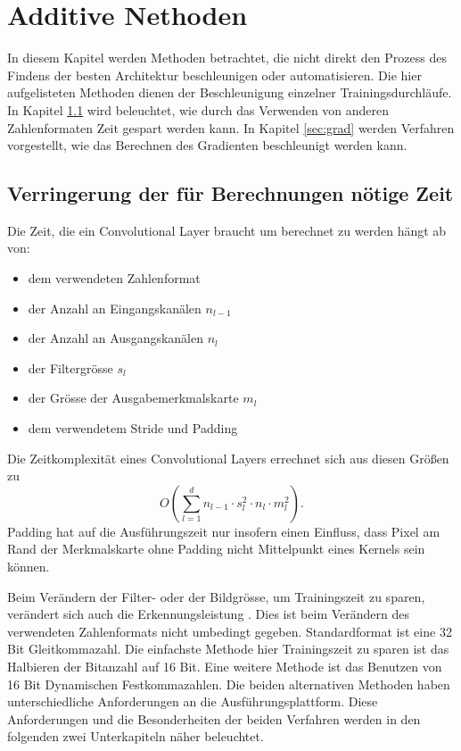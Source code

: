 \section{Additive Nethoden}\label{sec:add}
In diesem Kapitel werden Methoden betrachtet, die nicht direkt den Prozess des Findens der besten Architektur beschleunigen oder automatisieren. Die hier aufgelisteten Methoden dienen der Beschleunigung einzelner Trainingsdurchläufe. In Kapitel \ref{sec:fp16} wird beleuchtet, wie durch das Verwenden von anderen Zahlenformaten Zeit gespart werden kann. In Kapitel \ref{sec:grad} werden Verfahren vorgestellt, wie das Berechnen des Gradienten beschleunigt werden kann.
\subsection{Verringerung der für Berechnungen nötige Zeit}\label{sec:fp16}
Die Zeit, die ein Convolutional Layer braucht um berechnet zu werden hängt ab von:
\begin{itemize}
 \item dem verwendeten Zahlenformat
 \item der Anzahl an Eingangskanälen $n_{l-1}$
 \item der Anzahl an Ausgangskanälen $n_l$
 \item der Filtergr\"osse $s_l$
 \item der Grösse der Ausgabemerkmalskarte $m_l$ 
 \item dem verwendetem Stride und Padding
\end{itemize}
Die Zeitkomplexität eines Convolutional Layers errechnet sich aus diesen Größen zu \cite{complex}
\begin{equation}
 O\left( \sum_{l=1}^{d} n_{l-1} \cdot s^2_l \cdot n_l \cdot m_l^2 \right) .
\end{equation}
Padding hat auf die Ausführungszeit nur insofern einen Einfluss, dass Pixel am Rand der Merkmalskarte ohne Padding nicht Mittelpunkt eines Kernels sein können. 


Beim Verändern der Filter- oder der Bildgr\"osse, um Trainingszeit zu sparen, ver\"andert sich auch die Erkennungsleistung . Dies ist beim Verändern des verwendeten Zahlenformats nicht umbedingt gegeben. Standardformat ist eine 32 Bit Gleitkommazahl. Die einfachste Methode hier Trainingszeit zu sparen ist das Halbieren der Bitanzahl auf 16 Bit. Eine weitere Methode ist das Benutzen von 16 Bit Dynamischen Festkommazahlen.
Die beiden alternativen Methoden haben unterschiedliche Anforderungen an die Ausführungsplattform. Diese Anforderungen und die Besonderheiten der beiden Verfahren werden in den folgenden zwei Unterkapiteln näher beleuchtet.


